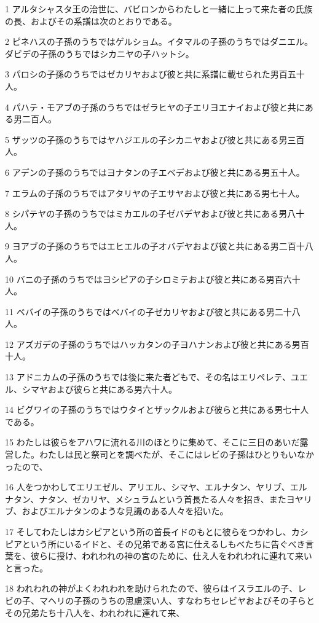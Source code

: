 \par 1 アルタシャスタ王の治世に、バビロンからわたしと一緒に上って来た者の氏族の長、およびその系譜は次のとおりである。
\par 2 ピネハスの子孫のうちではゲルショム。イタマルの子孫のうちではダニエル。ダビデの子孫のうちではシカニヤの子ハットシ。
\par 3 パロシの子孫のうちではゼカリヤおよび彼と共に系譜に載せられた男百五十人。
\par 4 パハテ・モアブの子孫のうちではゼラヒヤの子エリヨエナイおよび彼と共にある男二百人。
\par 5 ザッツの子孫のうちではヤハジエルの子シカニヤおよび彼と共にある男三百人。
\par 6 アデンの子孫のうちではヨナタンの子エベデおよび彼と共にある男五十人。
\par 7 エラムの子孫のうちではアタリヤの子エサヤおよび彼と共にある男七十人。
\par 8 シパテヤの子孫のうちではミカエルの子ゼバデヤおよび彼と共にある男八十人。
\par 9 ヨアブの子孫のうちではエヒエルの子オバデヤおよび彼と共にある男二百十八人。
\par 10 バニの子孫のうちではヨシピアの子シロミテおよび彼と共にある男百六十人。
\par 11 ベバイの子孫のうちではベバイの子ゼカリヤおよび彼と共にある男二十八人。
\par 12 アズガデの子孫のうちではハッカタンの子ヨハナンおよび彼と共にある男百十人。
\par 13 アドニカムの子孫のうちでは後に来た者どもで、その名はエリペレテ、ユエル、シマヤおよび彼らと共にある男六十人。
\par 14 ビグワイの子孫のうちではウタイとザックルおよび彼らと共にある男七十人である。
\par 15 わたしは彼らをアハワに流れる川のほとりに集めて、そこに三日のあいだ露営した。わたしは民と祭司とを調べたが、そこにはレビの子孫はひとりもいなかったので、
\par 16 人をつかわしてエリエゼル、アリエル、シマヤ、エルナタン、ヤリブ、エルナタン、ナタン、ゼカリヤ、メシュラムという首長たる人々を招き、またヨヤリブ、およびエルナタンのような見識のある人々を招いた。
\par 17 そしてわたしはカシピアという所の首長イドのもとに彼らをつかわし、カシピアという所にいるイドと、その兄弟である宮に仕えるしもべたちに告ぐべき言葉を、彼らに授け、われわれの神の宮のために、仕え人をわれわれに連れて来いと言った。
\par 18 われわれの神がよくわれわれを助けられたので、彼らはイスラエルの子、レビの子、マヘリの子孫のうちの思慮深い人、すなわちセレビヤおよびその子らとその兄弟たち十八人を、われわれに連れて来、
